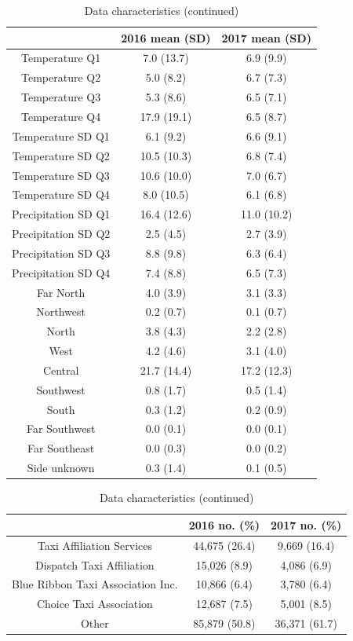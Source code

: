 \documentclass[twoside,11pt]{article}
\begin{document}
\begin{table}[H]
    \centering
    \begin{tabular}{c|c|c}
         & 2016 mean (SD) & 2017 mean (SD) \\
         \hline
        Temperature Q1 & 7.0 (13.7) & 6.9 (9.9)\\
        Temperature Q2 & 5.0 (8.2) & 6.7 (7.3)\\
        Temperature Q3 & 5.3 (8.6) & 6.5 (7.1)\\
        Temperature Q4 & 17.9 (19.1) & 6.5 (8.7)\\
        Temperature SD Q1 & 6.1 (9.2) & 6.6 (9.1)\\
        Temperature SD Q2 & 10.5 (10.3) & 6.8 (7.4)\\
        Temperature SD Q3 & 10.6 (10.0) & 7.0 (6.7)\\
        Temperature SD Q4 & 8.0 (10.5) & 6.1 (6.8)\\
        Precipitation SD Q1 & 16.4 (12.6) & 11.0 (10.2)\\
        Precipitation SD Q2 & 2.5 (4.5) & 2.7 (3.9)\\
        Precipitation SD Q3 & 8.8 (9.8) & 6.3 (6.4)\\
        Precipitation SD Q4 & 7.4 (8.8) & 6.5 (7.3)\\
        Far North & 4.0 (3.9) & 3.1 (3.3)\\
        Northwest & 0.2 (0.7) & 0.1 (0.7)\\
        North & 3.8 (4.3) & 2.2 (2.8)\\
        West & 4.2 (4.6) & 3.1 (4.0)\\
        Central & 21.7 (14.4) & 17.2 (12.3)\\
        Southwest & 0.8 (1.7) & 0.5 (1.4)\\
        South & 0.3 (1.2) & 0.2 (0.9)\\
        Far Southwest & 0.0 (0.1) & 0.0 (0.1)\\
        Far Southeast & 0.0 (0.3) & 0.0 (0.2)\\
        Side unknown & 0.3 (1.4) & 0.1 (0.5)\\
    \end{tabular}
    \caption{Data characteristics (continued)}
    \label{tab:data_characteristics2}
\end{table}

\begin{table}[H]
    \centering
    \begin{tabular}{c|c|c}
         & 2016 no. (\%) & 2017 no. (\%) \\
         \hline
         Taxi Affiliation Services & 44,675 (26.4) & 9,669 (16.4)\\
         Dispatch Taxi Affiliation & 15,026 (8.9) & 4,086 (6.9)\\
         Blue Ribbon Taxi Association Inc.& 10,866 (6.4) & 3,780 (6.4)\\
         Choice Taxi Association & 12,687 (7.5) & 5,001 (8.5)\\
         Other & 85,879 (50.8) & 36,371 (61.7)
    \end{tabular}
    \caption{Data characteristics (continued)}
    \label{tab:data_characteristics3}
\end{table}
\end{document}

